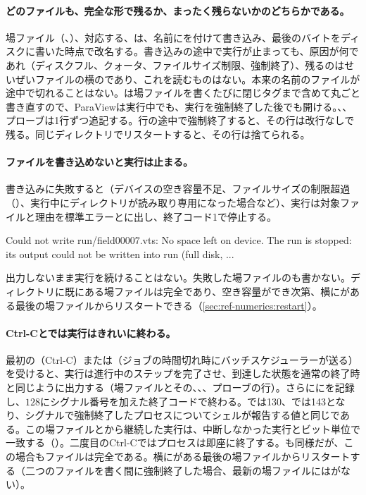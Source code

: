 \paragraph{どのファイルも、完全な形で残るか、まったく残らないかのどちらかである。}場ファイル（、）、対応する、は、名前にを付けて書き込み、最後のバイトをディスクに書いた時点で改名する。書き込みの途中で実行が止まっても、原因が何であれ（ディスクフル、クォータ、ファイルサイズ制限、強制終了）、残るのはせいぜいファイルの横のであり、これを読むものはない。本来の名前のファイルが途中で切れることはない。は場ファイルを書くたびに閉じタグまで含めて丸ごと書き直すので、ParaViewは実行中でも、実行を強制終了した後でも開ける。、、プローブは1行ずつ追記する。行の途中で強制終了すると、その行は改行なしで残る。同じディレクトリでリスタートすると、その行は捨てられる。

\paragraph{ファイルを書き込めないと実行は止まる。}書き込みに失敗すると（デバイスの空き容量不足、ファイルサイズの制限超過（）、実行中にディレクトリが読み取り専用になった場合など）、実行は対象ファイルと理由を標準エラーとに出し、終了コード1で停止する。

\begin{plain}
Could not write run/field00007.vts: No space left on device.
The run is stopped: its output could not be written into run (full disk, ...
\end{plain}

出力しないまま実行を続けることはない。失敗した場ファイルのも書かない。ディレクトリに既にある場ファイルは完全であり、空き容量ができ次第、横にがある最後の場ファイルからリスタートできる（\cref{sec:ref-numerics:restart}）。

\paragraph{Ctrl-Cとでは実行はきれいに終わる。}最初の（Ctrl-C）または（ジョブの時間切れ時にバッチスケジューラーが送る）を受けると、実行は進行中のステップを完了させ、到達した状態を通常の終了時と同じように出力する（場ファイルとその、、、プローブの行）。さらににを記録し、$128$にシグナル番号を加えた終了コードで終わる。では130、では143となり、シグナルで強制終了したプロセスについてシェルが報告する値と同じである。この場ファイルとから継続した実行は、中断しなかった実行とビット単位で一致する（）。二度目のCtrl-Cではプロセスは即座に終了する。も同様だが、この場合もファイルは完全である。横にがある最後の場ファイルからリスタートする（二つのファイルを書く間に強制終了した場合、最新の場ファイルにはがない）。

